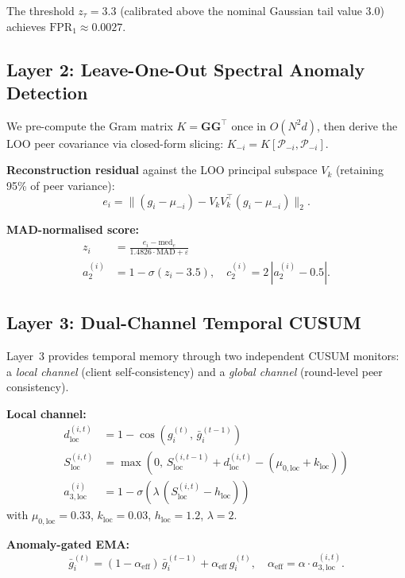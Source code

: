 \documentclass[journal]{IEEEtran}
\begin{document}
The threshold $z_\tau = 3.3$ (calibrated above the nominal Gaussian tail
value 3.0) achieves $\mathrm{FPR}_1 \approx 0.0027$.

\subsection{Layer 2: Leave-One-Out Spectral Anomaly Detection}
We pre-compute the Gram matrix $K = \mathbf{G}\mathbf{G}^\top$ once in
$O(N^2 d)$, then derive the LOO peer covariance via closed-form slicing:
$K_{-i} = K[\mathcal{P}_{-i}, \mathcal{P}_{-i}]$.

\textbf{Reconstruction residual} against the LOO principal subspace $V_k$
(retaining 95\% of peer variance):
\begin{equation}
  e_i = \|(g_i - \mu_{-i}) - V_k V_k^\top (g_i - \mu_{-i})\|_2.
\end{equation}

\textbf{MAD-normalised score:}
\begin{align}
  z_i &= \frac{e_i - \mathrm{med}_e}{1.4826 \cdot \mathrm{MAD} + \varepsilon} \\
  a_2^{(i)} &= 1 - \sigma(z_i - 3.5), \quad c_2^{(i)} = 2\,|a_2^{(i)} - 0.5|.
\end{align}

\subsection{Layer 3: Dual-Channel Temporal CUSUM}
Layer~3 provides temporal memory through two independent CUSUM monitors:
a \emph{local channel} (client self-consistency) and a \emph{global channel}
(round-level peer consistency).

\textbf{Local channel:}
\begin{align}
  d_{\mathrm{loc}}^{(i,t)} &= 1 - \cos(g_i^{(t)},\, \bar{g}_i^{(t-1)}) \\
  S_{\mathrm{loc}}^{(i,t)} &= \max\!\left(0,\, S_{\mathrm{loc}}^{(i,t-1)}
                              + d_{\mathrm{loc}}^{(i,t)} - (\mu_{0,\mathrm{loc}} + k_{\mathrm{loc}})\right) \\
  a_{3,\mathrm{loc}}^{(i)} &= 1 - \sigma\!\left(\lambda\,(S_{\mathrm{loc}}^{(i,t)} - h_{\mathrm{loc}})\right)
\end{align}
with $\mu_{0,\mathrm{loc}}{=}0.33$, $k_{\mathrm{loc}}{=}0.03$, $h_{\mathrm{loc}}{=}1.2$, $\lambda{=}2$.

\textbf{Anomaly-gated EMA:}
\begin{equation}
  \bar{g}_i^{(t)} = (1 - \alpha_{\mathrm{eff}})\,\bar{g}_i^{(t-1)} + \alpha_{\mathrm{eff}}\,g_i^{(t)}, \quad
  \alpha_{\mathrm{eff}} = \alpha \cdot a_{3,\mathrm{loc}}^{(i,t)}.
\end{equation}
\end{document}
